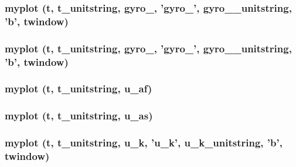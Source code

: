 \subsubsection[{myplot}]{\setlength{\rightskip}{0pt plus 5cm}myplot ({\bf t}, \/  {\bf t\_\-unitstring}, \/  {\bf gyro\_}, \/  '{\bf gyro\_}', \/  {\bf gyro\_\_\-unitstring}, \/  'b', \/  {\bf twindow})}\label{matlab_2dataviewer_8m_a92b2271614b8e4db5bd9065ca9431b7c}
\subsubsection[{myplot}]{\setlength{\rightskip}{0pt plus 5cm}myplot ({\bf t}, \/  {\bf t\_\-unitstring}, \/  {\bf gyro\_}, \/  '{\bf gyro\_}', \/  {\bf gyro\_\_\-unitstring}, \/  'b', \/  {\bf twindow})}\label{matlab_2dataviewer_8m_a7b3e9345846eb2f43ddcab1347385cb0}
\subsubsection[{myplot}]{\setlength{\rightskip}{0pt plus 5cm}myplot ({\bf t}, \/  {\bf t\_\-unitstring}, \/  {\bf u\_\-af})}\label{matlab_2dataviewer_8m_a0235314eb349f4c40b6b9323e3dec8f2}
\subsubsection[{myplot}]{\setlength{\rightskip}{0pt plus 5cm}myplot ({\bf t}, \/  {\bf t\_\-unitstring}, \/  {\bf u\_\-as})}\label{matlab_2dataviewer_8m_a21e79887915c6d7f0fc7a4d2f9af6093}
\subsubsection[{myplot}]{\setlength{\rightskip}{0pt plus 5cm}myplot ({\bf t}, \/  {\bf t\_\-unitstring}, \/  {\bf u\_\-k}, \/   '{\bf u\_\-k}', \/  {\bf u\_\-k\_\-unitstring}, \/  'b', \/  {\bf twindow})}\label{matlab_2dataviewer_8m_aa7d97caab7c50eaec7db56dfefed3760}
